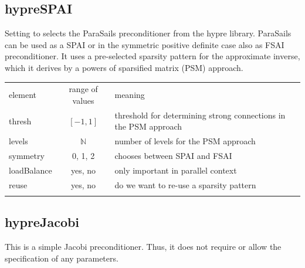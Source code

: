 \subsection{hypreSPAI}
%
%
Setting  to  selects the ParaSails preconditioner
from the hypre library. ParaSails can be used as a SPAI or in the symmetric
positive definite case also as FSAI preconditioner. It uses a pre-selected
sparsity pattern for the approximate inverse, which it derives by a powers of
sparsified matrix (PSM) approach.
%
%
\begin{center}
\begin{tabular}{lcp{}}
\hline\noalign{\smallskip}
element & range of values & meaning \\
\noalign{\smallskip}\hline\noalign{\smallskip}
thresh      & $[-1,1]$     & threshold for determining strong connections in
                             the PSM approach\\
levels      & $\mathbb{N}$ & number of levels for the PSM approach\\
symmetry    & 0, 1, 2      & chooses between SPAI and FSAI\\
loadBalance & yes, no      & only important in parallel context\\
reuse       & yes, no      & do we want to re-use a sparsity pattern\\
\noalign{\smallskip}\hline
\end{tabular}
\end{center}
%
%
\subsection{hypreJacobi}
%
%
This is a simple Jacobi preconditioner. Thus, it does not require or allow the
specification of any parameters.
%
%
